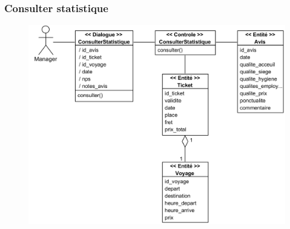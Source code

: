         \subsubsection[Consulter statistique]{Consulter statistique}
            \begin{figure}[H]
                \centering
                \includegraphics[width=130mm]{images/diagrammes-de-classes-participantes/consulter-statistique Class Diagram.png}
                \label{fig:cpStat}
            \end{figure}
\pagebreak
        